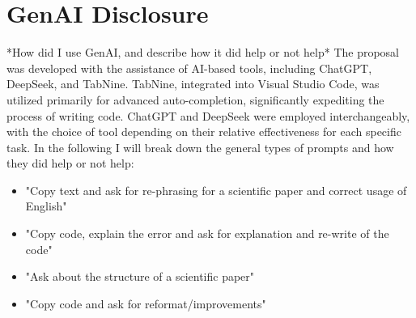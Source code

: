 \documentclass[sigplan, nonacm]{acmart}
\begin{document}
    \section{GenAI Disclosure}
        *How did I use GenAI, and describe how it did help or not help*
        The proposal was developed with the assistance of AI-based tools, including ChatGPT, DeepSeek, and TabNine. TabNine, integrated into Visual Studio Code, was utilized primarily for advanced auto-completion, significantly expediting the process of writing code. ChatGPT and DeepSeek were employed interchangeably, with the choice of tool depending on their relative effectiveness for each specific task. In the following I will break down the general types of prompts and how they did help or not help:
        \begin{itemize}
		\item "Copy text and ask for re-phrasing for a scientific paper and correct usage of English"
		\item "Copy code, explain the error and ask for explanation and re-write of the code"
		\item "Ask about the structure of a scientific paper"
            \item "Copy code and ask for reformat/improvements"
	\end{itemize}
        
    
    
    
    
\end{document}
